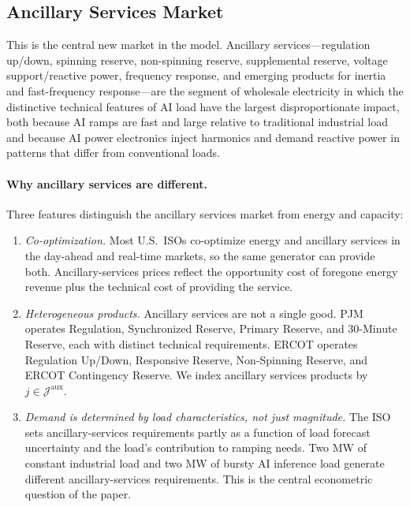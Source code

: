\documentclass[12pt,letterpaper]{article}
\begin{document}
\subsection{Ancillary Services Market}
\label{sec:aux_market}

This is the central new market in the model. Ancillary services---regulation
up/down, spinning reserve, non-spinning reserve, supplemental reserve,
voltage support/reactive power, frequency response, and emerging products
for inertia and fast-frequency response---are the segment of wholesale
electricity in which the distinctive technical features of AI load have the
largest disproportionate impact, both because AI ramps are fast and large
relative to traditional industrial load and because AI power electronics
inject harmonics and demand reactive power in patterns that differ from
conventional loads.

\paragraph{Why ancillary services are different.} Three features distinguish
the ancillary services market from energy and capacity:
\begin{enumerate}[leftmargin=*]
    \item \emph{Co-optimization.} Most U.S.\ ISOs co-optimize energy and
    ancillary services in the day-ahead and real-time markets, so the same
    generator can provide both. Ancillary-services prices reflect the
    opportunity cost of foregone energy revenue plus the technical cost of
    providing the service.
    \item \emph{Heterogeneous products.} Ancillary services are not a
    single good. PJM operates Regulation, Synchronized Reserve, Primary
    Reserve, and 30-Minute Reserve, each with distinct technical
    requirements. ERCOT operates Regulation Up/Down, Responsive Reserve,
    Non-Spinning Reserve, and ERCOT Contingency Reserve. We index ancillary
    services products by $j \in \mathcal{J}^{\text{aux}}$.
    \item \emph{Demand is determined by load characteristics, not just
    magnitude.} The ISO sets ancillary-services requirements partly as a
    function of load forecast uncertainty and the load's contribution to
    ramping needs. Two MW of constant industrial load and two MW of bursty
    AI inference load generate different ancillary-services requirements.
    This is the central econometric question of the paper.
\end{enumerate}
\end{document}

